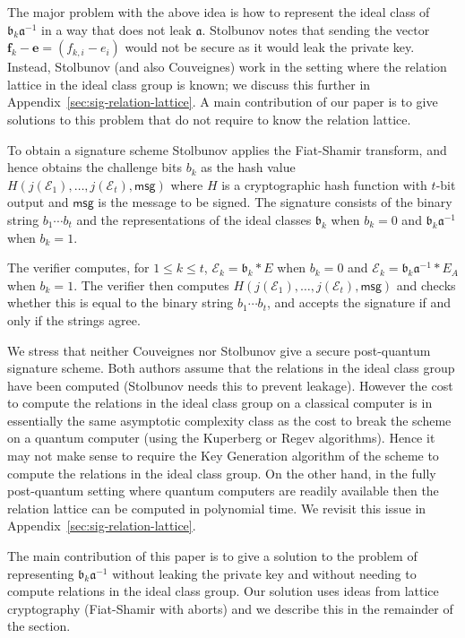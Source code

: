 \documentclass{llncs}
\newcommand{\E}{\mathcal{E}}
\newcommand{\msg}{\mathsf{msg}}
\renewcommand{\a}{\mathfrak{a}}
\renewcommand{\b}{\mathfrak{b}}
\renewcommand{\l}{\mathfrak{l}}
\newcommand{\e}{\mathbf{e}}
\newcommand{\f}{\mathbf{f}}
\begin{document}
The major problem with the above idea is how to represent the ideal class of $\b_k \a^{-1}$ in a way that does not leak $\a$.
Stolbunov notes that sending the vector $\f_k - \e = (f_{k,i} - e_i )$ would not be secure as it would leak the private key.
Instead, Stolbunov (and also Couveignes) work in the setting where the relation lattice in the ideal class group is known; we discuss this further in Appendix~\ref{sec:sig-relation-lattice}.
%
A main contribution of our paper is to give solutions to this problem that do not require to know the relation lattice.

To obtain a signature scheme Stolbunov applies the Fiat-Shamir transform, and hence obtains the challenge bits $b_k$ as the hash value $H( j(\E_1), \dots, j(\E_t) , \msg )$ where $H$ is a cryptographic hash function with $t$-bit output and $\msg$ is the message to be signed.
The signature consists of the binary string $b_1\cdots b_t$ and the representations of the ideal classes $\b_k$ when $b_k = 0$ and $\b_k \a^{-1}$ when $b_k = 1$.

The verifier computes, for $1 \le k \le t$, $\E_k = \b_k * E$ when $b_k = 0$ and $\E_k = \b_k \a^{-1} * E_A$ when $b_k = 1$. The verifier then computes $H( j( \E_1), \dots, j(\E_t), \msg )$ and checks whether this is equal to the binary string $b_1\cdots b_t$, and accepts the signature if and only if the strings agree.


We stress that neither Couveignes nor Stolbunov give a secure post-quantum signature scheme.
Both authors assume that the relations in the ideal class group have been computed (Stolbunov needs this to prevent leakage).
However the cost to compute the relations in the ideal class group on a classical computer is in essentially the same asymptotic complexity class as the cost to break the scheme on a quantum computer (using the Kuperberg or Regev algorithms).
Hence it may not make sense to require the Key Generation algorithm of the scheme to compute the relations in the ideal class group.
On the other hand, in the fully post-quantum setting where quantum computers are readily available then the relation lattice can be computed in polynomial time.
We revisit this issue in Appendix~\ref{sec:sig-relation-lattice}.




The main contribution of this paper is to give a solution to the problem of representing $\b_k \a^{-1}$ without leaking the private key and without needing to compute relations in the ideal class group.
Our solution uses ideas from lattice cryptography (Fiat-Shamir with aborts) and we describe this in the remainder of the section.
\end{document}
